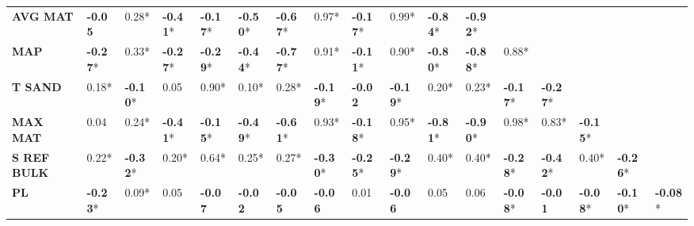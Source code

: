 \begin{table}
\begin{tabular}{p{1.6cm}p{0.68cm}p{0.68cm}p{0.68cm}p{0.68cm}p{0.68cm}p{0.68cm}p{0.68cm}p{0.68cm}p{0.68cm}p{0.68cm}p{0.68cm}p{0.68cm}p{0.68cm}p{0.68cm}p{0.68cm}p{0.68cm}}
\textbf{AVG MAT} & \textbf{-0.05} & 0.28* & \textbf{-0.41}* & \textbf{-0.17}* & \textbf{-0.50}* & \textbf{-0.67}* & 0.97* & \textbf{-0.17}* & 0.99* & \textbf{-0.84}* & \textbf{-0.92}* &  &  &  &  &  \\
\textbf{MAP} & \textbf{-0.27}* & 0.33* & \textbf{-0.27}* & \textbf{-0.29}* & \textbf{-0.44}* & \textbf{-0.77}* & 0.91* & \textbf{-0.11}* & 0.90* & \textbf{-0.80}* & \textbf{-0.88}* & 0.88* &  &  &  &  \\
\textbf{T SAND} & 0.18* & \textbf{-0.10}* & 0.05 & 0.90* & 0.10* & 0.28* & \textbf{-0.19}* & \textbf{-0.02} & \textbf{-0.19}* & 0.20* & 0.23* & \textbf{-0.17}* & \textbf{-0.27}* &  &  &  \\
\textbf{MAX MAT} & 0.04 & 0.24* & \textbf{-0.41}* & \textbf{-0.15}* & \textbf{-0.49}* & \textbf{-0.61}* & 0.93* & \textbf{-0.18}* & 0.95* & \textbf{-0.81}* & \textbf{-0.90}* & 0.98* & 0.83* & \textbf{-0.15}* &  &  \\
\textbf{S REF BULK} & 0.22* & \textbf{-0.32}* & 0.20* & 0.64* & 0.25* & 0.27* & \textbf{-0.30}* & \textbf{-0.25}* & \textbf{-0.29}* & 0.40* & 0.40* & \textbf{-0.28}* & \textbf{-0.42}* & 0.40* & \textbf{-0.26}* &  \\
\textbf{PL} & \textbf{-0.23}* & 0.09* & 0.05 & \textbf{-0.07} & \textbf{-0.02} & \textbf{-0.05} & \textbf{-0.06} & 0.01 & \textbf{-0.06} & 0.05 & 0.06 & \textbf{-0.08}* & \textbf{-0.01} & \textbf{-0.08}* & \textbf{-0.10}* & \textbf{-0.08}* \\
\bottomrule
\end{tabular}
\end{table}